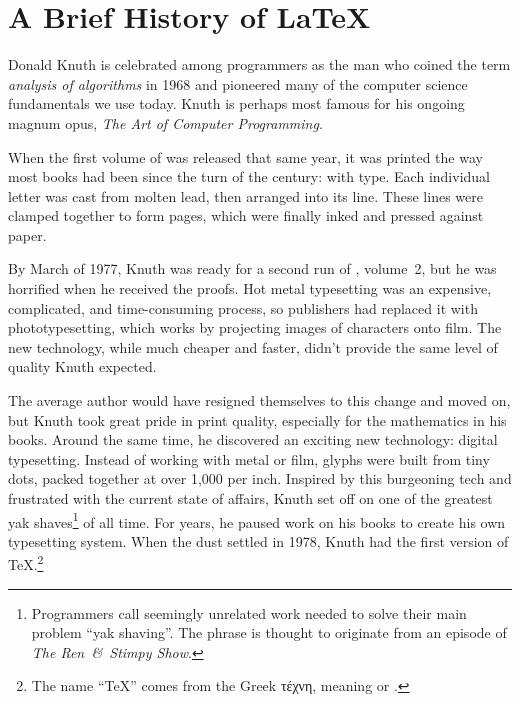 \chapter{A Brief History of \texorpdfstring{\LaTeX}{LaTeX}}

\label{history}

Donald Knuth is celebrated among programmers as
the man who coined the term \emph{analysis of algorithms} in 1968
and pioneered many of the computer science fundamentals we use today.
Knuth is perhaps most famous for his ongoing magnum opus,
\textit{The Art of Computer Programming}.

When the first volume of  was released that same year,
it was printed the way most books had been since the turn of the century:
with  type.
Each individual letter was cast from molten lead,
then arranged into its line.
These lines were clamped together to form pages,
which were finally inked and pressed against paper.

By March of 1977, Knuth was ready for a second run of , volume~2,
but he was horrified when he received the proofs.
Hot metal typesetting was an expensive, complicated, and time-consuming process,
so publishers had replaced it with phototypesetting,
which works by projecting images of characters onto film.
The new technology, while much cheaper and faster,
didn't provide the same level of quality Knuth
expected.\punckern{}

The average author would have resigned themselves to this change and moved on,
but Knuth took great pride in print quality,
especially for the mathematics in his books.
Around the same time, he discovered an exciting new technology:
digital typesetting.
Instead of working with metal or film,
glyphs were built from tiny dots,
packed together at over 1,000 per inch.
Inspired by this burgeoning tech and frustrated with the current state of affairs,
Knuth set off on one of the greatest yak shaves\footnote{Programmers
call seemingly unrelated work needed to solve their main problem
``yak shaving''\quotekern. The phrase is thought to originate from an episode
of \textit{The Ren~\&~Stimpy Show}.\punckern{}}
of all time.
For years, he paused work on his books to create his own
typesetting system.
When the dust settled in 1978, Knuth had the first version of
\TeX.\punckern\footnote{The name ``\TeX{}'' comes from the Greek
{τέχνη},
meaning  or .\punckern{}}

